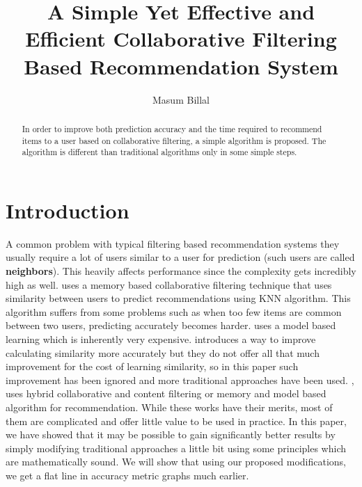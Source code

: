 \documentclass[manuscript,screen,review]{acmart}
\title{\bfseries A Simple Yet Effective and Efficient Collaborative Filtering Based Recommendation System}
\author{Masum Billal}
\begin{document}
	\begin{abstract}
		In order to improve both prediction accuracy and the time required to recommend items to a user based on collaborative filtering, a simple algorithm is proposed. The algorithm is different than traditional algorithms only in some simple steps.
	\end{abstract}
	\maketitle
	\section{Introduction}
	A common problem with typical filtering based recommendation systems they usually require a lot of users similar to a user for prediction (such users are called \textbf{neighbors}). This heavily affects performance since the complexity gets incredibly high as well. \textcite{herlocker_konstan_borchers_riedl_1999} uses a memory based collaborative filtering technique that uses similarity between users to predict recommendations using KNN algorithm. This algorithm suffers from some problems such as when too few items are common between two users, predicting accurately becomes harder. \textcite{bell_koren_volinsky_2007} uses a model based learning which is inherently very expensive. \textcite{shen_wei_yang_2013} introduces a way to improve calculating similarity more accurately but they do not offer all that much improvement for the cost of learning similarity, so in this paper such improvement has been ignored and more traditional approaches have been used. \textcite{jamali_ester_2009}, \textcite{pavlov_pennock_2002} uses hybrid collaborative and content filtering or memory and model based algorithm for recommendation. While these works have their merits, most of them are complicated and offer little value to be used in practice. In this paper, we have showed that it may be possible to gain significantly better results by simply modifying traditional approaches a little bit using some principles which are mathematically sound. We will show that using our proposed modifications, we get a flat line in accuracy metric graphs much earlier.
\end{document}
